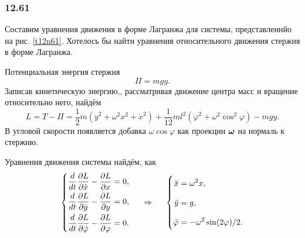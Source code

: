 \subsubsection*{12.61}

Составим уравнения движения в форме Лагранжа для системы, представленнйо на рис. \ref{t12n61}. Хотелось бы найти уравнения относительного движения стержня в форме Лагранжа.

Потенциальная энергия стержня
\begin{equation*}
    \Pi = mgy.
\end{equation*}
Записав кинетическую энергию,, рассматривая движение центра масс и вращение относительно него, найдём 
\begin{equation}
    L = T - \Pi = 
    \frac{1}{2} m \left(
        \dot{y}^2 + \omega^2 x^2 + \dot{x}^2
    \right) + 
    \frac{1}{12} m l^2 \left(
        \dot{\varphi}^2 + \omega^2 \cos^2 \varphi
    \right) - mgy.
\end{equation}
В угловой скорости появляется добавка $\omega \cos \varphi$ как проекции $\mbox{\boldmath $\omega$}$ на нормаль к стержню. 

Уравнения движения системы найдём, как
\begin{equation}
    \left\{\begin{aligned}
        \EqL{x},  \\
        \EqL{y}, \\
        \EqL{\varphi}.
    \end{aligned}\right.
    \hspace{0.5cm} \Rightarrow \hspace{0.5cm} 
    \left\{\begin{aligned}
       \vp  \ddot{x} &= \omega^2 x,\\
       \vp  \ddot{y} &= g, \\
       \vp  \ddot{\varphi} &= -  \omega^2 \sin (2 \varphi) / 2.
    \end{aligned}\right.
\end{equation}